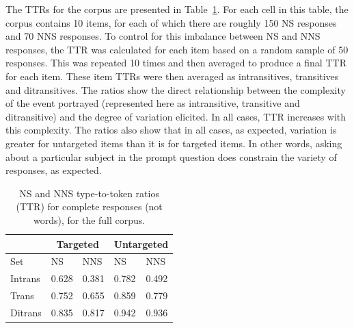 The TTRs for the corpus are presented in Table~\ref{tab:ttr}. 
For each cell in this table, the corpus contains 10 items, for each of which there are roughly 150 NS responses and 70 NNS responses. 
To control for this imbalance between NS and NNS responses, the TTR was calculated for each item based on a random sample of 50 responses.  This was repeated 10 times and then averaged to produce a final TTR for each item. These item TTRs were then averaged as intransitives, transitives and ditransitives. The ratios show the direct relationship between the complexity of the event portrayed (represented here as intransitive, transitive and ditransitive) and the degree of variation elicited. In all cases, TTR increases with this complexity.
The ratios also show that in all cases, as expected, variation is greater for untargeted items than it is for targeted items. In other words, asking about a particular subject in the prompt question does constrain the variety of responses, as expected.

\begin{table}[h!]
\begin{center}
\begin{tabular}{|l||l|l||l|l|}
\hline
 & \multicolumn{2}{|c||}{Targeted} & \multicolumn{2}{|c|}{Untargeted} \\
\hline
 Set & NS & NNS & NS & NNS \\
\hline
\hline
Intrans & 0.628 & 0.381 & 0.782 & 0.492 \\
\hline
Trans & 0.752 & 0.655 & 0.859 & 0.779 \\ %
\hline
Ditrans & 0.835 & 0.817 & 0.942 & 0.936 \\ 
\hline
\end{tabular}
\caption{\label{tab:ttr} NS and NNS type-to-token ratios (TTR) for complete responses (not words), for the full corpus.}
\end{center}
\end{table}

